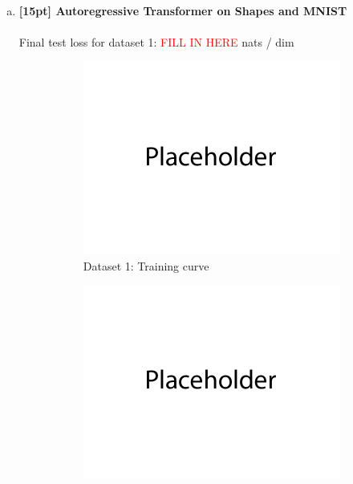\documentclass{article}
\begin{document}
\newpage
{}

\begin{enumerate}[(a)]
\item {\bf [15pt] Autoregressive Transformer on Shapes and MNIST} \\\\
Final test loss for dataset 1: \textcolor{red}{FILL IN HERE}  nats / dim
\begin{figure}[H]
    \centering
    \begin{subfigure}{0.45\textwidth}
        \centering
        \includegraphics[width=\textwidth]{figures/placeholder.png}
        \caption{Dataset 1: Training curve}
    \end{subfigure}
    \hspace{0.2in}
    \begin{subfigure}{0.45\textwidth}
        \centering
        \includegraphics[width=\textwidth]{figures/placeholder.png}

\end{subfigure}
\end{figure}
\end{enumerate}
\end{document}
